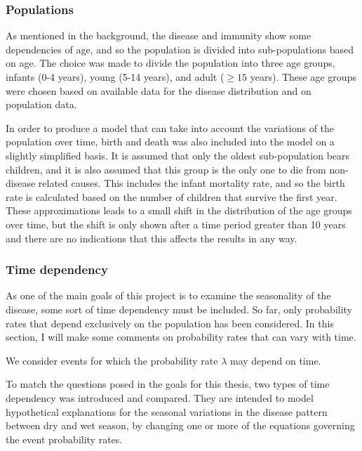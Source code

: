 \documentclass[10pt,a4paper]{article}
\begin{document}


\subsubsection{Populations}

As mentioned in the background, the disease and immunity show some dependencies of age, and so the population is divided into sub-populations based on age. The choice was made to divide the population into three age groups, infants (0-4 years), young (5-14 years), and adult ($\geq15$ years). These age groups were chosen based on available data for the disease distribution and on population data.

In order to produce a model that can take into account the variations of the population over time, birth and death was also included into the model on a slightly simplified basis. It is assumed that only the oldest sub-population bears children, and it is also assumed that this group is the only one to die from non-disease related causes. This includes the infant mortality rate, and so the birth rate is calculated based on the number of children that survive the first year. These approximations leads to a small shift in the distribution of the age groups over time, but the shift is only shown after a time period greater than 10 years and there are no indications that this affects the results in any way.

\subsubsection{Time dependency}

As one of the main goals of this project is to examine the seasonality of the disease, some sort of time dependency must be included. So far, only probability rates that depend exclusively on the population has been considered. In this section, I will make some comments on probability rates that can vary with time.

We consider events for which the probability rate $\lambda$ may depend on time. 

To match the questions posed in the goals for this thesis, two types of time dependency was introduced and compared. They are intended to model hypothetical explanations for the seasonal variations in the disease pattern between dry and wet season, by changing one or more of the equations governing the event probability rates.
\end{document}
